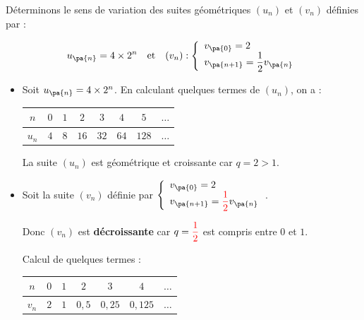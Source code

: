 \begin{methode}
	Déterminons le sens de variation des suites géométriques $(u_{n})$ et $(v_{n})$ définies par :

	\[
		u_{\pa{n}} = 4 \times 2^{n} \quad\text{et}\quad (v_n):\left\{\begin{array}{l}v_{\pa{0}} = 2 \\v_{\pa{n + 1}} = \dfrac{1}{2}v_{\pa{n}}\end{array} \right.
	\]

	\begin{correction}
		\nline
		\begin{itemize}
			\item Soit $u_{\pa{n}} = 4 \times 2^{n}$. En calculant quelques termes de $(u_n)$, on a :

			      \begin{center}
				      \begin{tabular}{|c|c|c|c|c|c|c|c|}
					      \hline
					      \ccg $n$   & $0$ & $1$ & $2$  & $3$  & $4$  & $5$   & $\dots$ \\ \hline
					      \ccg $u_n$ & $4$ & $8$ & $16$ & $32$ & $64$ & $128$ & $\dots$ \\ \hline
				      \end{tabular}
			      \end{center}

			      La suite $(u_{n})$ est géométrique et croissante car $q = 2 > 1$.

			\item Soit la suite $(v_{n})$ définie par $\left\{\begin{array}{l}v_{\pa{0}} = 2 \\ v_{\pa{n + 1}} = {\color{red}\dfrac{1}{2}}v_{\pa{n}}\end{array}\right.$.

			      Donc $(v_n)$ est \textbf{décroissante} car $q = {\color{red}\dfrac{1}{2}}$ est compris entre $0$ et $1$.

			      Calcul de quelques termes :

			      \begin{center}
				      \begin{tabular}{|c|c|c|c|c|c|c|}
					      \hline
					      \ccg $n$   & $0$ & $1$ & $2$     & $3$      & $4$       & $\dots$ \\ \hline
					      \ccg $v_n$ & $2$ & $1$ & $0{,}5$ & $0{,}25$ & $0{,}125$ & $\dots$ \\ \hline
				      \end{tabular}
			      \end{center}
		\end{itemize}
	\end{correction}
\end{methode}

